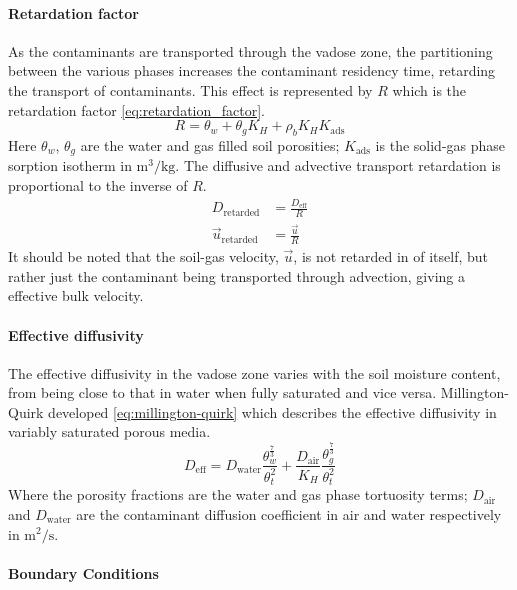 \paragraph{Retardation factor}

As the contaminants are transported through the vadose zone, the partitioning between the various phases increases the contaminant residency time, retarding the transport of contaminants.
This effect is represented by $R$ which is the retardation factor \eqref{eq:retardation_factor}.
\begin{equation}\label{eq:retardation_factor}
  R = \theta_w + \theta_g K_H + \rho_b K_H K_\mathrm{ads}
\end{equation}
Here $\theta_w$, $\theta_g$ are the water and gas filled soil porosities;
$K_\mathrm{ads}$ is the solid-gas phase sorption isotherm in $\mathrm{m^3/kg}$.
The diffusive and advective transport retardation is proportional to the inverse of $R$.
\begin{align}
  D_\mathrm{retarded} &= \frac{D_\mathrm{eff}}{R} \\
  \vec{u}_\mathrm{retarded} &= \frac{\vec{u}}{R}
\end{align}
It should be noted that the soil-gas velocity, $\vec{u}$, is not retarded in of itself, but rather just the contaminant being transported through advection, giving a effective bulk velocity.\par

\paragraph{Effective diffusivity}

The effective diffusivity in the vadose zone varies with the soil moisture content, from being close to that in water when fully saturated and vice versa.
Millington-Quirk developed \eqref{eq:millington-quirk} which describes the effective diffusivity in variably saturated porous media.
\begin{equation}\label{eq:millington-quirk}
  D_\mathrm{eff} = D_\mathrm{water} \frac{\theta_w^\frac{7}{3}}{\theta_t^2} + \frac{D_\mathrm{air}}{K_H} \frac{\theta_g^\frac{7}{3}}{\theta_t^2}
\end{equation}
Where the porosity fractions are the water and gas phase tortuosity terms;
$D_\mathrm{air}$ and $D_\mathrm{water}$ are the contaminant diffusion coefficient in air and water respectively in $\mathrm{m^2/s}$.\par

\paragraph{Boundary Conditions}

